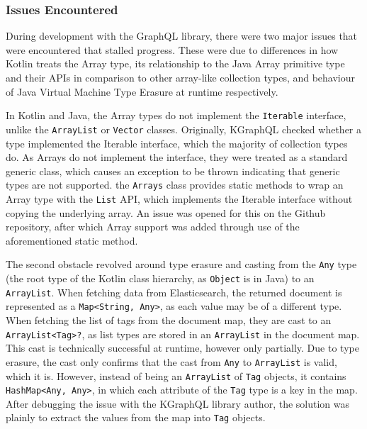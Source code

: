 \documentclass[12pt,pdftex,titlepage]{report}
\begin{document}
                \subsubsection{Issues Encountered}
                    During development with the GraphQL library, there were two major issues that were encountered that stalled progress. These were due to differences in how Kotlin treats the Array type, its
                    relationship to the Java Array primitive type and their APIs in comparison to other array-like collection types, and behaviour of Java Virtual Machine Type Erasure\cite{typeerasure} at runtime respectively.
                    
                    \smallskip
                    In Kotlin and Java, the Array types do not implement the \texttt{Iterable} interface, unlike the \texttt{ArrayList} or \texttt{Vector} classes. Originally, KGraphQL checked whether a type implemented the 
                    Iterable interface, which the majority of collection types do. As Arrays do not implement the interface, they were treated as a standard generic class, which causes an exception to be thrown indicating 
                    that generic types are not supported. the \texttt{Arrays} class provides static methods to wrap an Array type with the \texttt{List} API, which implements the Iterable interface without copying the 
                    underlying array. An issue was opened for this on the Github repository, after which Array support was added through use of the aforementioned static method.

                    The second obstacle revolved around type erasure and casting from the \texttt{Any} type (the root type of the Kotlin class hierarchy, as \texttt{Object} is in Java) to an \texttt{ArrayList}. When fetching data from 
                    Elasticsearch, the returned document is represented as a \texttt{Map<String, Any>}, as each value may be of a different type. When fetching the list of tags from the document map, they are cast to an 
                    \texttt{ArrayList<Tag>?}, as list types are stored in an \texttt{ArrayList} in the document map. This cast is technically successful at runtime, however only partially. Due to type erasure, the cast only 
                    confirms that the cast from \texttt{Any} to \texttt{ArrayList} is valid, which it is. However, instead of being an \texttt{ArrayList} of \texttt{Tag} objects, it contains \texttt{HashMap<Any, Any>}, in which 
                    each attribute of the \texttt{Tag} type is a key in the map. After debugging the issue with the KGraphQL library author, the solution was plainly to extract the values from the map into \texttt{Tag} objects.
            
\end{document}
